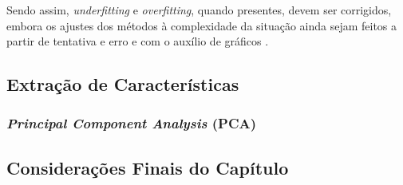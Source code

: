 Sendo assim, \textit{underfitting} e \textit{overfitting}, quando presentes, devem ser corrigidos, embora os ajustes dos métodos à complexidade da situação ainda sejam feitos a partir de tentativa e erro e com o auxílio de gráficos \citep{Goodfellow2016}.

\subsection{Extração de Características}

\subsubsection{\textit{Principal Component Analysis} (PCA)}

\subsection{Considerações Finais do Capítulo}